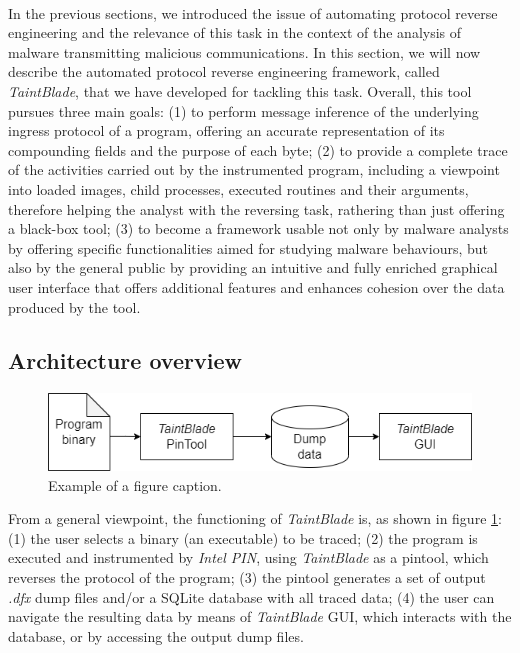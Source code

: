 \documentclass[conference]{IEEEtran}
\begin{document}
\

In the previous sections, we introduced the issue of automating protocol
reverse engineering and the relevance of this task in the context of the
analysis of malware transmitting malicious communications. In this section, we
will now describe the automated protocol reverse engineering framework, called
\textit{TaintBlade}, that we have developed for tackling this task. Overall,
this tool pursues three main goals: (1) to perform message inference of the
underlying ingress protocol of a program, offering an accurate representation
of its compounding fields and the purpose of each byte; (2) to provide a
complete trace of the activities carried out by the instrumented program,
including a viewpoint into loaded images, child processes, executed routines
and their arguments, therefore helping the analyst with the reversing task,
rathering than just offering a black-box tool; (3) to become a framework usable
not only by malware analysts by offering specific functionalities aimed for
studying malware behaviours, but also by the general public by providing an
intuitive and fully enriched graphical user interface that offers additional
features and enhances cohesion over the data produced by the tool.

\subsection{Architecture overview}

\begin{figure}[htbp]
    \centerline{\includegraphics[width=0.9\columnwidth]{images/generalarch.drawio.png}}
    \caption{Example of a figure caption.}
    \label{fig_3_generalarch}
\end{figure}

From a general viewpoint, the functioning of \textit{TaintBlade} is, as shown
in figure \ref{fig_3_generalarch}: (1) the user selects a binary (an
executable) to be traced; (2) the program is executed and instrumented by
\textit{Intel PIN}, using \textit{TaintBlade} as a pintool, which reverses the
protocol of the program; (3) the pintool generates a set of output
\textit{.dfx} dump files and/or a SQLite database with all traced data; (4) the
user can navigate the resulting data by means of \textit{TaintBlade} GUI, which
interacts with the database, or by accessing the output dump files.
\end{document}
